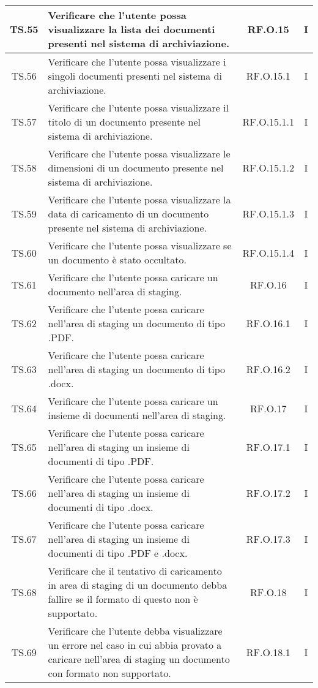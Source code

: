 {{{{{{{{{{\begin{xltabular}{\textwidth}{|c|X|c|c|}
\hline
TS.55 & Verificare che l'utente possa visualizzare la lista dei documenti presenti nel sistema di archiviazione. & RF.O.15 & I \\
\hline
TS.56 & Verificare che l'utente possa visualizzare i singoli documenti presenti nel sistema di archiviazione. & RF.O.15.1 & I \\
\hline
TS.57 & Verificare che l'utente possa visualizzare il titolo di un documento presente nel sistema di archiviazione. & RF.O.15.1.1 & I \\
\hline
TS.58 & Verificare che l'utente possa visualizzare le dimensioni di un documento presente nel sistema di archiviazione. & RF.O.15.1.2 & I \\
\hline
TS.59 & Verificare che l'utente possa visualizzare la data di caricamento di un documento presente nel sistema di archiviazione. & RF.O.15.1.3 & I \\
\hline
TS.60 & Verificare che l'utente possa visualizzare se un documento è stato occultato. & RF.O.15.1.4 & I \\
\hline
TS.61 & Verificare che l'utente possa caricare un documento nell’area di staging. & RF.O.16 & I \\
\hline
TS.62 & Verificare che l'utente possa caricare nell’area di staging un documento di tipo .PDF. & RF.O.16.1 & I \\
\hline
TS.63 & Verificare che l'utente possa caricare nell’area di staging un documento di tipo .docx. & RF.O.16.2 & I \\
\hline
TS.64 & Verificare che l'utente possa caricare un insieme di documenti nell’area di staging. & RF.O.17 & I \\
\hline
TS.65 & Verificare che l'utente possa caricare nell’area di staging un insieme di documenti di tipo .PDF. & RF.O.17.1 & I \\
\hline
TS.66 & Verificare che l'utente possa caricare nell’area di staging un insieme di documenti di tipo .docx. & RF.O.17.2 & I \\
\hline
TS.67 & Verificare che l'utente possa caricare nell’area di staging un insieme di documenti di tipo .PDF e .docx. & RF.O.17.3 & I \\
\hline
TS.68 & Verificare che il tentativo di caricamento in area di staging di un documento debba fallire se il formato di questo non è supportato. & RF.O.18 & I \\
\hline
TS.69 & Verificare che l'utente debba visualizzare un errore nel caso in cui abbia provato a caricare nell’area di staging un documento con formato non supportato. & RF.O.18.1 & I \\

\end{xltabular}}}}}}}}}}}
